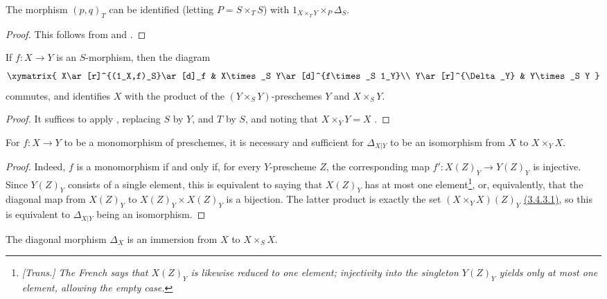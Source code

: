 \begin{corollary}[5.3.6]
\label{I.5.3.6}
The morphism $(p,q)_T$ can be identified (letting $P=S\times_T S$) with $1_{X\times_T Y}\times_P\Delta_S$.
\end{corollary}

\begin{proof}
This follows from  and .
\end{proof}

\begin{corollary}[5.3.7]
\label{I.5.3.7}
If $f:X\to Y$ is an $S$-morphism, then the diagram
\[
  \xymatrix{
    X\ar[r]^{(1_X,f)_S}\ar[d]_f &
    X\times_S Y\ar[d]^{f\times_S 1_Y}\\
    Y\ar[r]^{\Delta_Y} &
    Y\times_S Y
  }
\]
commutes, and identifies $X$ with the product of the $(Y\times_S Y)$-preschemes $Y$ and $X\times_S Y$.
\end{corollary}

\begin{proof}
It suffices to apply , replacing $S$ by $Y$, and $T$ by $S$, and noting that $X\times_Y Y=X$ .
\end{proof}

\begin{proposition}[5.3.8]
\label{I.5.3.8}
For $f:X\to Y$ to be a monomorphism of preschemes, it is necessary and sufficient for $\Delta_{X|Y}$ to be an isomorphism from $X$ to $X\times_Y X$.
\end{proposition}

\begin{proof}
Indeed, $f$ is a monomorphism if and only if, for every $Y$-prescheme $Z$, the corresponding map $f':X(Z)_Y\to Y(Z)_Y$ is injective.
Since $Y(Z)_Y$ consists of a single element, this is equivalent to saying that $X(Z)_Y$ has at most one element\footnote{\emph{[Trans.] The French says that $X(Z)_Y$ is likewise reduced to one element; injectivity into the singleton $Y(Z)_Y$ yields only at most one element, allowing the empty case.}}, or, equivalently, that the diagonal map from $X(Z)_Y$ to $X(Z)_Y\times X(Z)_Y$ is a bijection.
The latter product is exactly the set $(X\times_Y X)(Z)_Y$ \hyperref[I.3.4.3]{(3.4.3.1)}, so this is equivalent to $\Delta_{X|Y}$ being an isomorphism.
\end{proof}

\begin{proposition}[5.3.9]
\label{I.5.3.9}
The diagonal morphism $\Delta_X$ is an immersion from $X$ to $X\times_S X$.
\end{proposition}

